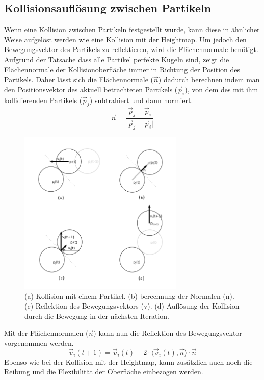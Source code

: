 \begin{Spacing}{\mylinespace}
    \subsection{Kollisionsauflösung zwischen Partikeln}
    	Wenn eine Kollision zwischen Partikeln festgestellt wurde, kann diese in
    	ähnlicher Weise aufgelöst werden wie eine Kollision mit der Heightmap.
    	Um jedoch den Bewegungsvektor des Partikels zu reflektieren, wird die
    	Flächennormale benötigt. Aufgrund der Tatsache dass alle Partikel
    	perfekte Kugeln sind, zeigt die	Flächennormale der Kollisionoberfläche
    	immer in Richtung der Position des Partikels. Daher lässt sich die
    	Flächennormale ($\vec{n}$) dadurch berechnen indem man den Positionsvektor des
    	aktuell betrachteten Partikels ($\vec{p}_{i}$), von dem des mit ihm kollidierenden
    	Partikels ($\vec{p}_{j}$) subtrahiert und dann normiert.
    	\[ \vec{n} = \frac{ \vec{p}_{j} - \vec{p}_{i} }{ \vert \vec{p}_{j} - \vec{p}_{i} \vert } \]
    	\begin{figure}[h!]
			\centering
			\vspace*{30px}
			\includegraphics[width=0.7\textwidth]{graphics/Phys_kp1234.png}
			\caption{ (a) Kollision mit einem Partikel. (b) berechnung der Normalen (n). (c) Reflektion des Bewegungsvektors (v). (d) Auflösung der Kollision durch die Bewegung in der nächsten Iteration. }
			\label{fig:partkoll2}
		\end{figure}
		Mit der Flächennormalen ($\vec{n}$) kann nun die Reflektion des
		Bewegungsvektor vorgenommen werden.
		\[ \vec{v}_{i}(t+1) = \vec{v}_{i}(t) -2 \cdot \langle \vec{v}_{i}(t) , \vec{n} \rangle \cdot \vec{n} \]
		Ebenso wie bei der Kollision mit der Heightmap, kann zusätzlich auch
		noch die Reibung und die Flexibilität der Oberfläche einbezogen werden.
	

\end{Spacing}
